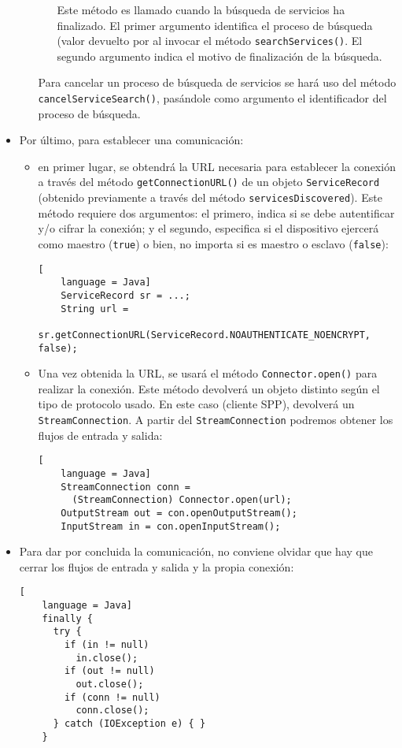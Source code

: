\begin{itemize}
\begin{itemize}
\begin{itemize}
    Este método es llamado cuando la búsqueda de servicios ha finalizado. El
    primer argumento identifica el proceso de búsqueda (valor devuelto por al
    invocar el método \texttt{searchServices()}. El segundo argumento indica el
    motivo de finalización de la búsqueda.
    \end{itemize}

  Para cancelar un proceso de búsqueda de servicios se hará uso del método
  \texttt{cancelServiceSearch()}, pasándole como argumento el identificador
  del proceso de búsqueda.
  \end{itemize}

\item Por último, para establecer una comunicación:
  \begin{itemize}
  \item en primer lugar, se obtendrá la \acs{URL} necesaria para establecer
  la conexión a través del método \texttt{getConnectionURL()} de un objeto
  \texttt{ServiceRecord} (obtenido previamente a través del método
  \texttt{servicesDiscovered}). Este método requiere dos argumentos: el
  primero, indica si se debe autentificar y/o cifrar la conexión; y el
  segundo, especifica si el dispositivo ejercerá como maestro (\texttt{true})
  o bien, no importa si es maestro o esclavo (\texttt{false}):

  \begin{lstlisting}[
    language = Java]
    ServiceRecord sr = ...;
    String url =
      sr.getConnectionURL(ServiceRecord.NOAUTHENTICATE_NOENCRYPT, false);
  \end{lstlisting}

  \item Una vez obtenida la \acs{URL}, se usará el método
  \texttt{Connector.open()} para realizar la conexión. Este método devolverá un 
  objeto distinto según el tipo de protocolo usado. En este caso (cliente
  \acs{SPP}), devolverá un \texttt{StreamConnection}. A partir del
  \texttt{StreamConnection} podremos obtener los flujos de entrada y salida:

  \begin{lstlisting}[
    language = Java]
    StreamConnection conn =
      (StreamConnection) Connector.open(url);
    OutputStream out = con.openOutputStream();
    InputStream in = con.openInputStream();
  \end{lstlisting}
  \end{itemize}

\item Para dar por concluida la comunicación, no conviene olvidar que hay que 
cerrar los flujos de entrada y salida y la propia conexión:

  \begin{lstlisting}[
    language = Java]
    finally {
      try {
        if (in != null)
          in.close();
        if (out != null)
          out.close();
        if (conn != null)
          conn.close();
      } catch (IOException e) { }
    }
  \end{lstlisting}
\end{itemize}

